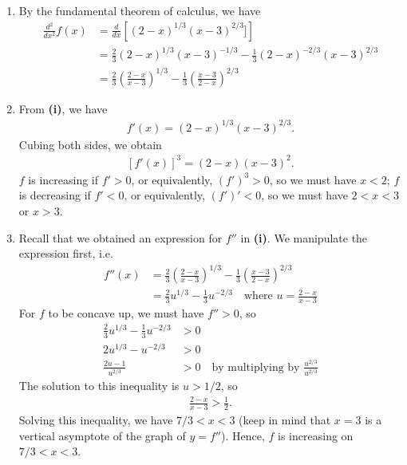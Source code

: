 \documentclass[12pt]{article}
\begin{document}
\begin{enumerate}[label=\textbf{(\roman*)}]
    \itemsep 0em
    \item By the fundamental theorem of calculus, we have \begin{align*}
        \frac{d^2}{dx^2}f\left(x\right)&=\frac{d}{dx}\left[\left(2-x\right)^{1/3}\left(x-3\right)^{2/3}]\right]\\
        &=\frac{2}{3}\left(2-x\right)^{1/3}\left(x-3\right)^{-1/3}-\frac{1}{3}\left(2-x\right)^{-2/3}\left(x-3\right)^{2/3}\\
        &=\frac{2}{3}\left(\frac{2-x}{x-3}\right)^{1/3}-\frac{1}{3}\left(\frac{x-3}{2-x}\right)^{2/3}
    \end{align*}
    \item From \textbf{(i)}, we have \begin{align*}
        f'\left(x\right)=\left(2-x\right)^{1/3}\left(x-3\right)^{2/3}.
    \end{align*}
    Cubing both sides, we obtain \begin{align*}
        \left[f'\left(x\right)\right]^3=\left(2-x\right)\left(x-3\right)^2.
    \end{align*}
    $f$ is increasing if $f'>0$, or equivalently, $\left(f'\right)^3>0$, so we must have $x<2$; $f$ is decreasing if $f'<0$, or equivalently, $\left(f'\right)'<0$, so we must have $2<x<3$ or $x>3$.
    \item Recall that we obtained an expression for $f''$ in \textbf{(i)}. We manipulate the expression first, i.e. \begin{align*}
        f''\left(x\right)&=\frac{2}{3}\left(\frac{2-x}{x-3}\right)^{1/3}-\frac{1}{3}\left(\frac{x-3}{2-x}\right)^{2/3}\\
        &=\frac{2}{3}u^{1/3}-\frac{1}{3}u^{-2/3}\quad\text{where }u=\frac{2-x}{x-3}
    \end{align*}
    For $f$ to be concave up, we must have $f''>0$, so \begin{align*}
        \frac{2}{3}u^{1/3}-\frac{1}{3}u^{-2/3}&>0\\
        2u^{1/3}-u^{-2/3}&>0\\
        \frac{2u-1}{u^{2/3}}&>0\quad\text{by multiplying by }\frac{u^{2/3}}{u^{2/3}}
    \end{align*}
    The solution to this inequality is $u>1/2$, so \begin{align*}
        \frac{2-x}{x-3}>\frac{1}{2}.
    \end{align*}
    Solving this inequality, we have $7/3<x<3$ (keep in mind that $x=3$ is a vertical asymptote of the graph of $y=f''$). Hence, $f$ is increasing on $7/3<x<3$.

\end{enumerate}
\end{document}
